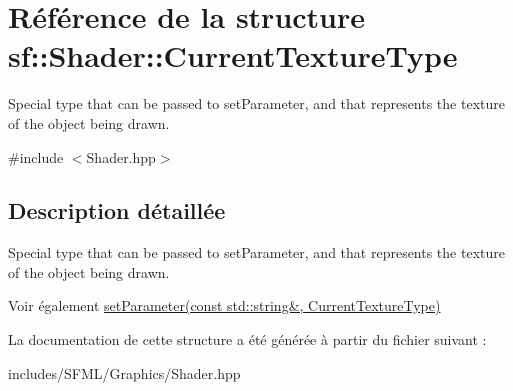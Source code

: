 \hypertarget{structsf_1_1Shader_1_1CurrentTextureType}{}\section{Référence de la structure sf\+:\+:Shader\+:\+:Current\+Texture\+Type}
\label{structsf_1_1Shader_1_1CurrentTextureType}


Special type that can be passed to set\+Parameter, and that represents the texture of the object being drawn.  




{\ttfamily \#include $<$Shader.\+hpp$>$}



\subsection{Description détaillée}
Special type that can be passed to set\+Parameter, and that represents the texture of the object being drawn. 

\begin{DoxySeeAlso}{Voir également}
\hyperlink{classsf_1_1Shader_af06b4cba0bab915fa01032b063909044}{set\+Parameter(const std\+::string\&, Current\+Texture\+Type)} 
\end{DoxySeeAlso}


La documentation de cette structure a été générée à partir du fichier suivant \+:\begin{DoxyCompactItemize}
\item 
includes/\+S\+F\+M\+L/\+Graphics/Shader.\+hpp\end{DoxyCompactItemize}
